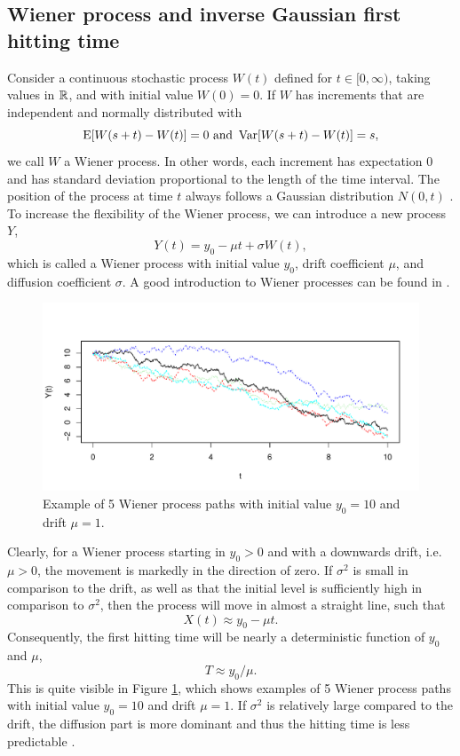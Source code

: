 \subsection{Wiener process and inverse Gaussian first hitting time}
Consider a continuous stochastic process $W(t)$ defined for $t\in[0,\infty)$, taking values in $\mathbb{R}$, and with initial value $W(0)=0$. If $W$ has increments that are independent and normally distributed with
\begin{equation*}
    \operatorname{E}[W(s+t)-W(t)]=0\text{   and   }\operatorname{Var}[W(s+t)-W(t)]=s,
\end{equation*}
we call $W$ a Wiener process. In other words, each increment has expectation 0 and has standard deviation proportional to the length of the time interval. The position of the process at time $t$ always follows a Gaussian distribution $N(0, t)$ \citep{ABG}. To increase the flexibility of the Wiener process, we can introduce a new process $Y$,
\begin{equation}\label{wiener}
    Y(t)=y_0-\mu t+\sigma W(t),
\end{equation}
which is called a Wiener process with initial value $y_0$, drift coefficient $\mu$, and diffusion coefficient $\sigma$. A good introduction to Wiener processes can be found in \citet{cox1965}.
\begin{figure}[H]
\label{plot:wiener}
\caption{Example of 5 Wiener process paths with initial value $y_0=10$ and drift $\mu=1$.}
\centering
\includegraphics[scale=0.4]{figures/wiener_processes.pdf}
\end{figure}
\noindent{}Clearly, for a Wiener process starting in $y_0>0$ and with a downwards drift, i.e. $\mu>0$, the movement is markedly in the direction of zero. If $\sigma^2$ is small in comparison to the drift, as well as that the initial level is sufficiently high in comparison to $\sigma^2$, then the process will move in almost a straight line, such that
\begin{equation*}
    X(t)\approx y_0-\mu t.
\end{equation*}
Consequently, the first hitting time will be nearly a deterministic function of $y_0$ and $\mu$,
\begin{equation}
    T\approx y_0/\mu.
\end{equation}
This is quite visible in Figure \ref{plot:wiener}, which shows examples of 5 Wiener process paths with initial value $y_0=10$ and drift $\mu=1$. If $\sigma^2$ is relatively large compared to the drift, the diffusion part is more dominant and thus the hitting time is less predictable \citep{ABG}.


